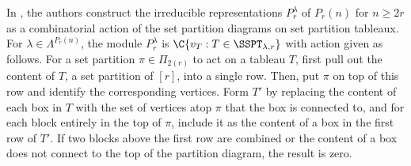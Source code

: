 In \cite{Halverson2018SetpartitionTA}, the authors construct the irreducible representations $P_r^\lambda$ of $P_r(n)$ for $n\geq 2r$ as a combinatorial action of the set partition diagrams on set partition tableaux. For $\lambda\in\Lambda^{P_r(n)}$, the module $P_r^\lambda$ is $\C\{v_T:T\in\SSPT_{\lambda,r}\}$ with action given as follows. For a set partition $\pi\in\Pi_{2(r)}$ to act on a tableau $T$, first pull out the content of $T$, a set partition of $[r]$, into a single row. Then, put $\pi$ on top of this row and identify the corresponding vertices. Form $T'$ by replacing the content of each box in $T$ with the set of vertices atop $\pi$ that the box is connected to, and for each block entirely in the top of $\pi$, include it as the content of a box in the first row of $T'$. If two blocks above the first row are combined or the content of a box does not connect to the top of the partition diagram, the result is zero.

